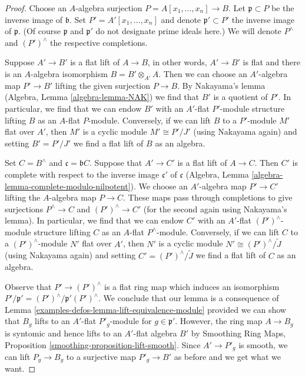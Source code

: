 \begin{proof}
Choose an $A$-algebra surjection $P = A[x_1, \ldots, x_n] \to B$.
Let $\mathfrak p \subset P$ be the inverse image of $\mathfrak b$.
Set $P' = A'[x_1, \ldots, x_n]$ and denote $\mathfrak p' \subset P'$
the inverse image of $\mathfrak p$. (Of course $\mathfrak p$
and $\mathfrak p'$ do not designate prime ideals here.)
We will denote $P^\wedge$ and $(P')^\wedge$ the respective completions.

\medskip\noindent
Suppose $A' \to B'$ is a flat lift of $A \to B$, in other words,
$A' \to B'$ is flat and there is an $A$-algebra isomorphism
$B = B' \otimes_{A'} A$. Then we can choose an $A'$-algebra map
$P' \to B'$ lifting the given surjection $P \to B$.
By Nakayama's lemma (Algebra, Lemma \ref{algebra-lemma-NAK})
we find that $B'$ is a quotient of $P'$. In particular, we find
that we can endow $B'$ with an $A'$-flat $P'$-module structure
lifting $B$ as an $A$-flat $P$-module.
Conversely, if we can lift $B$ to a $P'$-module $M'$ flat over $A'$,
then $M'$ is a cyclic module $M' \cong P'/J'$ (using Nakayama again)
and setting $B' = P'/J'$ we find a flat lift of $B$ as an algebra.

\medskip\noindent
Set $C = B^\wedge$ and $\mathfrak c = \mathfrak bC$.
Suppose that $A' \to C'$ is a flat lift of $A \to C$.
Then $C'$ is complete with respect to the inverse image $\mathfrak c'$
of $\mathfrak c$
(Algebra, Lemma \ref{algebra-lemma-complete-modulo-nilpotent}).
We choose an $A'$-algebra map $P' \to C'$ lifting
the $A$-algebra map $P \to C$. These maps pass through
completions to give surjections $P^\wedge \to C$ and $(P')^\wedge \to C'$
(for the second again using Nakayama's lemma).
In particular, we find that we can endow $C'$ with an $A'$-flat
$(P')^\wedge$-module structure lifting $C$ as an $A$-flat $P^\wedge$-module.
Conversely, if we can lift $C$ to a $(P')^\wedge$-module $N'$ flat over $A'$,
then $N'$ is a cyclic module $N' \cong (P')^\wedge/\tilde J$
(using Nakayama again) and setting $C' = (P')^\wedge/\tilde J$
we find a flat lift of $C$ as an algebra.

\medskip\noindent
Observe that $P' \to (P')^\wedge$ is a flat ring map which
induces an isomorphism $P'/\mathfrak p' = (P')^\wedge/\mathfrak p'(P')^\wedge$.
We conclude that our lemma is a consequence of
Lemma \ref{examples-defos-lemma-lift-equivalence-module} provided we can
show that $B_g$ lifts to an $A'$-flat $P'_g$-module for
$g \in \mathfrak p'$. However, the ring map $A \to B_g$ is syntomic
and hence lifts to an $A'$-flat algebra $B'$ by
Smoothing Ring Maps, Proposition \ref{smoothing-proposition-lift-smooth}.
Since $A' \to P'_g$ is smooth, we can lift $P_g \to B_g$
to a surjective map $P'_g \to B'$ as before and we get what we want.
\end{proof}

